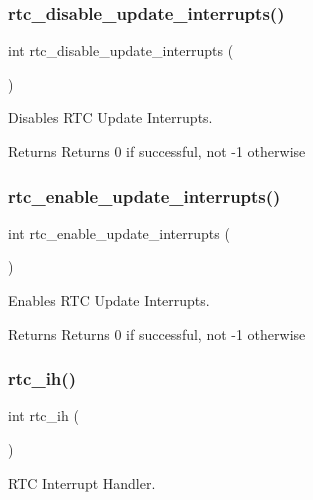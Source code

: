 \subsubsection{\texorpdfstring{rtc\_disable\_update\_interrupts()}{rtc\_disable\_update\_interrupts()}}
{\footnotesize\ttfamily int rtc\+\_\+disable\+\_\+update\+\_\+interrupts (\begin{DoxyParamCaption}{ }\end{DoxyParamCaption})}



Disables R\+TC Update Interrupts. 

\begin{DoxyReturn}{Returns}
Returns 0 if successful, not -\/1 otherwise 
\end{DoxyReturn}
\mbox{\label{group__rtc_ga1d3c9242fe8175549f6b898cf55582fd}} 
\subsubsection{\texorpdfstring{rtc\_enable\_update\_interrupts()}{rtc\_enable\_update\_interrupts()}}
{\footnotesize\ttfamily int rtc\+\_\+enable\+\_\+update\+\_\+interrupts (\begin{DoxyParamCaption}{ }\end{DoxyParamCaption})}



Enables R\+TC Update Interrupts. 

\begin{DoxyReturn}{Returns}
Returns 0 if successful, not -\/1 otherwise 
\end{DoxyReturn}
\mbox{\label{group__rtc_ga57f7116af216e3779ad9d6e98351d329}} 
\subsubsection{\texorpdfstring{rtc\_ih()}{rtc\_ih()}}
{\footnotesize\ttfamily int rtc\+\_\+ih (\begin{DoxyParamCaption}{ }\end{DoxyParamCaption})}



R\+TC Interrupt Handler. 

